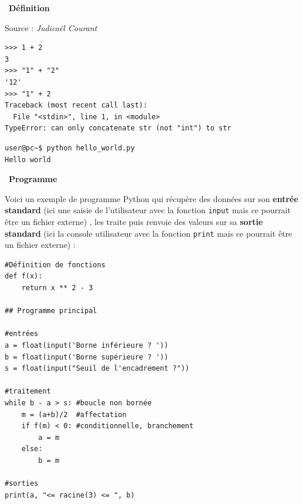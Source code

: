 \documentclass[a4paper, french, 12pt]{article}  %
\newcommand\bcpython{\texttt{[image: /home/fjunier/Maths/python-logo.png]}}
\newcounter{def}
\newenvironment{definition}[1]
{\par \medskip   \addtocounter{def}{1} \noindent  
\begin{bclogo}[arrondi =0.1,  ombre = true, barre=none, logo=\bcbook, marge=4]{~\textbf{Définition} \textbf{\thedef} {\itshape #1} }  \par}
{
\end{bclogo}
 \par \bigskip }
\newcounter{prog}
\newenvironment{programme}[1]
{\par \medskip   \addtocounter{prog}{1} \noindent  
 \begin {bclogo}[noborder = true, barre=zigzag,logo=\bcpython, marge=4] {~\textbf{Programme} \textbf{\theprog} {\itshape #1} }  \par  \bigskip}
{
\end{bclogo}
 \par \bigskip }
\begin{document}
\begin{definition}{}
\begin{center}
Source : \textit{Judicaël Courant}
\end{center}

\begin{minipage}{0.5\linewidth}
\begin{center}

\begin{lstlisting}[style=compil]
>>> 1 + 2
3
>>> "1" + "2"
'12'
>>> "1" + 2
Traceback (most recent call last):
  File "<stdin>", line 1, in <module>
TypeError: can only concatenate str (not "int") to str

\end{lstlisting}

\end{center}
\end{minipage}\hfill
\begin{minipage}{0.5\linewidth}
\begin{center}

\begin{lstlisting}[style=compil]
user@pc~$ python hello_world.py 
Hello world
\end{lstlisting}
\end{center}
\end{minipage}

\end{definition}

\begin{programme}{}

Voici un exemple de programme Python qui récupère des données sur son \textbf{entrée standard} (ici une saisie de l'utilisateur avec la fonction \texttt{input} mais ce pourrait être un fichier externe) , les traite puis renvoie des valeurs  sur sa \textbf{sortie standard} (ici la console utilisateur avec la fonction \texttt{print} mais ce pourrait être un fichier externe)   :


\begin{lstlisting}[style=rond]
#Définition de fonctions
def f(x):
    return x ** 2 - 3

## Programme principal

#entrées
a = float(input('Borne inférieure ? '))
b = float(input('Borne supérieure ? '))
s = float(input("Seuil de l'encadrement ?"))

#traitement 
while b - a > s: #boucle non bornée
    m = (a+b)/2  #affectation
    if f(m) < 0: #conditionnelle, branchement
        a = m
    else:
        b = m

#sorties
print(a, "<= racine(3) <= ", b)
\end{lstlisting}

\end{programme}
\end{document}
